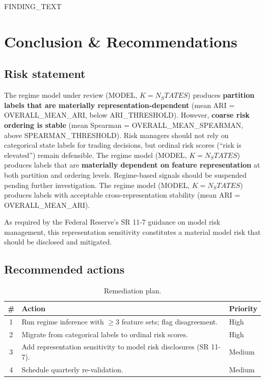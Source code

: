 \documentclass[11pt,a4paper]{article}
\begin{document}
\vspace{0.3cm}
\noindent
{{FINDING_TEXT}}



\newpage
\section{Conclusion \& Recommendations}

\subsection{Risk statement}

The regime model under review ({{MODEL}}, $K={{N_STATES}}$) produces
\textbf{partition labels that are materially representation-dependent}
(mean ARI = {{OVERALL_MEAN_ARI}}, below {{ARI_THRESHOLD}}).
However, \textbf{coarse risk ordering is stable}
(mean Spearman = {{OVERALL_MEAN_SPEARMAN}}, above {{SPEARMAN_THRESHOLD}}).
Risk managers should not rely on categorical state labels for trading
decisions, but ordinal risk scores (``risk is elevated'') remain defensible.
The regime model ({{MODEL}}, $K={{N_STATES}}$) produces labels that are
\textbf{materially dependent on feature representation} at both
partition and ordering levels. Regime-based signals should be suspended
pending further investigation.
The regime model ({{MODEL}}, $K={{N_STATES}}$) produces labels with acceptable
cross-representation stability (mean ARI = {{OVERALL_MEAN_ARI}}).

As required by the Federal Reserve's SR 11-7 guidance on model risk
management, this representation sensitivity constitutes a material model
risk that should be disclosed and mitigated.

\subsection{Recommended actions}

\begin{table}[H]
\centering
\renewcommand{\arraystretch}{1.3}
\begin{tabularx}{\textwidth}{c X l}
\toprule
\textbf{\#} & \textbf{Action} & \textbf{Priority} \\
\midrule
1 & Run regime inference with $\geq$3 feature sets; flag disagreement. & High \\
2 & Migrate from categorical labels to ordinal risk scores. & High \\
3 & Add representation sensitivity to model risk disclosures (SR 11-7). & Medium \\
4 & Schedule quarterly re-validation. & Medium \\
\bottomrule
\end{tabularx}
\caption{Remediation plan.}
\end{table}
\end{document}

